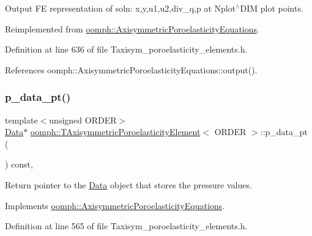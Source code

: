 Output FE representation of soln\+: x,y,u1,u2,div\+\_\+q,p at Nplot$^\wedge$\+D\+IM plot points. 



Reimplemented from \hyperlink{classoomph_1_1AxisymmetricPoroelasticityEquations_af5dcc8768f5323427ebaf17cad67a64a}{oomph\+::\+Axisymmetric\+Poroelasticity\+Equations}.



Definition at line 636 of file Taxisym\+\_\+poroelasticity\+\_\+elements.\+h.



References oomph\+::\+Axisymmetric\+Poroelasticity\+Equations\+::output().

\mbox{\label{classoomph_1_1TAxisymmetricPoroelasticityElement_a8442be1bbcd76fddaa91fc674785e3ea}} 
\subsubsection{\texorpdfstring{p\+\_\+data\+\_\+pt()}{p\_data\_pt()}}
{\footnotesize\ttfamily template$<$unsigned O\+R\+D\+ER$>$ \\
\hyperlink{classoomph_1_1Data}{Data}$\ast$ \hyperlink{classoomph_1_1TAxisymmetricPoroelasticityElement}{oomph\+::\+T\+Axisymmetric\+Poroelasticity\+Element}$<$ O\+R\+D\+ER $>$\+::p\+\_\+data\+\_\+pt (\begin{DoxyParamCaption}{ }\end{DoxyParamCaption}) const\hspace{0.3cm}{\ttfamily [inline]}, {\ttfamily [virtual]}}



Return pointer to the \hyperlink{classoomph_1_1Data}{Data} object that stores the pressure values. 



Implements \hyperlink{classoomph_1_1AxisymmetricPoroelasticityEquations_a56e87b385e891d4d5c04e984306c4a27}{oomph\+::\+Axisymmetric\+Poroelasticity\+Equations}.



Definition at line 565 of file Taxisym\+\_\+poroelasticity\+\_\+elements.\+h.



